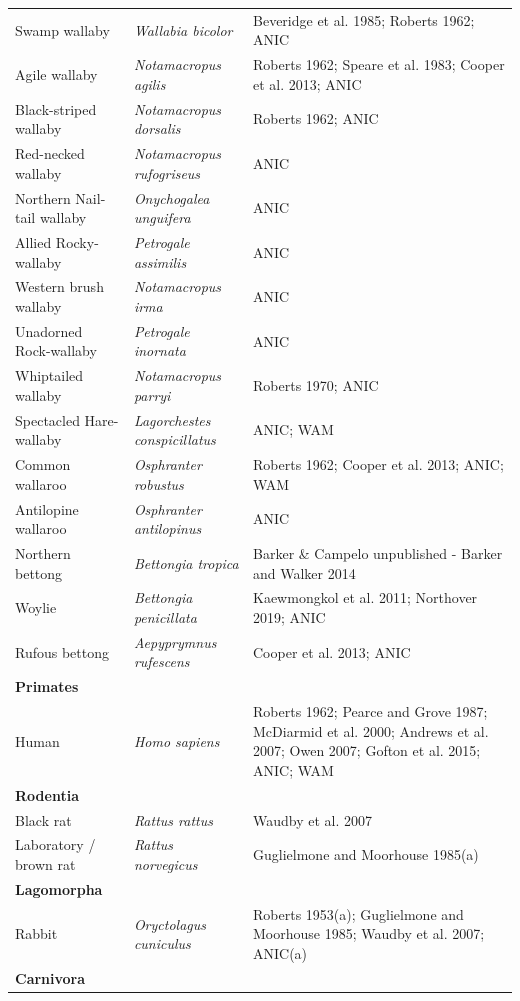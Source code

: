 \documentclass[a4paper, nobind]{templates/ociamthesis}
\begin{document}
\begin{longtable}[t]{>{\raggedright\arraybackslash}p{3cm}>{}l>{\raggedright\arraybackslash}p{6cm}}
Swamp wallaby & \em{Wallabia bicolor} & Beveridge et al. 1985; Roberts 1962; ANIC\\
Agile wallaby & \em{Notamacropus agilis} & Roberts 1962; Speare et al. 1983; Cooper et al. 2013; ANIC\\
Black-striped wallaby & \em{Notamacropus dorsalis} & Roberts 1962; ANIC\\
Red-necked wallaby & \em{Notamacropus rufogriseus} & ANIC\\
Northern Nail-tail wallaby & \em{Onychogalea unguifera} & ANIC\\
Allied Rocky-wallaby & \em{Petrogale assimilis} & ANIC\\
Western brush wallaby & \em{Notamacropus irma} & ANIC\\
Unadorned Rock-wallaby & \em{Petrogale inornata} & ANIC\\
Whiptailed wallaby & \em{Notamacropus parryi} & Roberts 1970; ANIC\\
Spectacled Hare-wallaby & \em{Lagorchestes conspicillatus} & ANIC; WAM\\
Common wallaroo & \em{Osphranter robustus} & Roberts 1962; Cooper et al. 2013;  ANIC; WAM\\
Antilopine wallaroo & \em{Osphranter antilopinus} & ANIC\\
Northern bettong & \em{Bettongia tropica} & Barker \& Campelo unpublished - Barker and Walker 2014\\
Woylie & \em{Bettongia penicillata} & Kaewmongkol et al. 2011; Northover 2019; ANIC\\
Rufous bettong & \em{Aepyprymnus rufescens} & Cooper et al. 2013; ANIC\\
\textbf{Primates} & \em{\textbf{}} & \textbf{}\\
Human & \em{Homo sapiens} & Roberts 1962; Pearce and Grove 1987; McDiarmid et al. 2000; Andrews et al. 2007; Owen 2007; Gofton et al. 2015; ANIC; WAM\\
\textbf{Rodentia} & \em{\textbf{}} & \textbf{}\\
Black rat & \em{Rattus rattus} & Waudby et al. 2007\\
Laboratory / brown rat & \em{Rattus norvegicus} & Guglielmone and Moorhouse 1985(a)\\
\textbf{Lagomorpha} & \em{\textbf{}} & \textbf{}\\
Rabbit & \em{Oryctolagus cuniculus} & Roberts 1953(a); Guglielmone and Moorhouse 1985; Waudby et al. 2007; ANIC(a)\\
\textbf{Carnivora} & \em{\textbf{}} & \textbf{}\\

\end{longtable}
\end{document}
